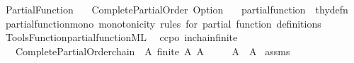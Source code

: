 %
\begin{isabellebody}%
%
%
\isadelimdocument
%
\endisadelimdocument
%
\isatagdocument
%
\isamarkuptrue%
%
\endisatagdocument
{\isafolddocument}%
%
\isadelimdocument
%
\endisadelimdocument
%
\isadelimtheory
%
\endisadelimtheory
%
\isatagtheory
{}\isamarkupfalse%
\ Partial{\isacharunderscore}{\kern0pt}Function\isanewline
\ \ \ Complete{\isacharunderscore}{\kern0pt}Partial{\isacharunderscore}{\kern0pt}Order\ Option\isanewline
\ \ \ {\isachardoublequoteopen}partial{\isacharunderscore}{\kern0pt}function{\isachardoublequoteclose}\ {\isacharcolon}{\kern0pt}{\isacharcolon}{\kern0pt}\ thy{\isacharunderscore}{\kern0pt}defn\isanewline
{}%
\endisatagtheory
{\isafoldtheory}%
%
\isadelimtheory
\isanewline
%
\endisadelimtheory
\isanewline
{}\isamarkupfalse%
\ partial{\isacharunderscore}{\kern0pt}function{\isacharunderscore}{\kern0pt}mono\ {\isachardoublequoteopen}monotonicity\ rules\ for\ partial\ function\ definitions{\isachardoublequoteclose}\isanewline
%
\isadelimML
%
\endisadelimML
%
\isatagML
{}\isamarkupfalse%
\ {\isacartoucheopen}Tools{\isacharslash}{\kern0pt}Function{\isacharslash}{\kern0pt}partial{\isacharunderscore}{\kern0pt}function{\isachardot}{\kern0pt}ML{\isacartoucheclose}%
\endisatagML
{\isafoldML}%
%
\isadelimML
\isanewline
%
\endisadelimML
\isanewline
{}\isamarkupfalse%
\ {\isacharparenleft}{\kern0pt}\ ccpo{\isacharparenright}{\kern0pt}\ in{\isacharunderscore}{\kern0pt}chain{\isacharunderscore}{\kern0pt}finite{\isacharcolon}{\kern0pt}\isanewline
\ \ \ {\isachardoublequoteopen}Complete{\isacharunderscore}{\kern0pt}Partial{\isacharunderscore}{\kern0pt}Order{\isachardot}{\kern0pt}chain\ {\isacharparenleft}{\kern0pt}{\isasymle}{\isacharparenright}{\kern0pt}\ A{\isachardoublequoteclose}\ {\isachardoublequoteopen}finite\ A{\isachardoublequoteclose}\ {\isachardoublequoteopen}A\ {\isasymnoteq}\ {\isacharbraceleft}{\kern0pt}{\isacharbraceright}{\kern0pt}{\isachardoublequoteclose}\isanewline
\ \ \ {\isachardoublequoteopen}{\isasymSqunion}A\ {\isasymin}\ A{\isachardoublequoteclose}\isanewline
%
\isadelimproof
%
\endisadelimproof
%
\isatagproof
{}\isamarkupfalse%
\ assms{\isacharparenleft}{\kern0pt}{}{\isacharcomma}{\kern0pt}{}{\isacharcomma}{\kern0pt}{}{\isacharparenright}{\kern0pt}\isanewline

\end{isabellebody}
